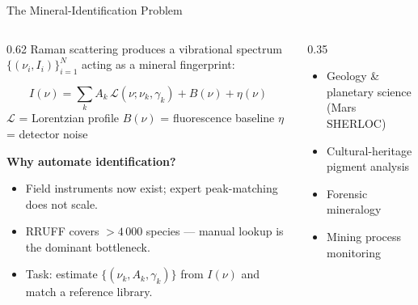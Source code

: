 \documentclass[aspectratio=169,10pt]{beamer}
\begin{document}
\begin{frame}{The Mineral-Identification Problem}
  \begin{columns}[T]
    \begin{column}{0.62\textwidth}
      Raman scattering produces a vibrational spectrum
      $\{(\nu_i,I_i)\}_{i=1}^N$ acting as a mineral fingerprint:\par
      \vspace{0.2cm}
      \begin{tcolorbox}[mathbox]
        \[
          I(\nu)=\sum_k A_k\,\mathcal{L}(\nu;\nu_k,\gamma_k)+B(\nu)+\eta(\nu)
        \]
        \centering\footnotesize
        $\mathcal{L}$ = Lorentzian profile\quad
        $B(\nu)$ = fluorescence baseline\quad
        $\eta$ = detector noise
      \end{tcolorbox}
      \vspace{0.18cm}
      {\small\bfseries\color{headerbg}Why automate identification?}
      \begin{itemize}\setlength\itemsep{0.10cm}\small
        \item Field instruments now exist; expert peak-matching does not scale.
        \item RRUFF covers $>4\,000$ species --- manual lookup is the dominant bottleneck.
        \item Task: estimate $\{(\nu_k,A_k,\gamma_k)\}$ from $I(\nu)$ and match
              a reference library.
      \end{itemize}
    \end{column}
    \begin{column}{0.35\textwidth}
      \begin{tcolorbox}[domainbox, title={Domains directly affected}]
        \footnotesize
        \begin{itemize}\setlength\itemsep{0.10cm}
          \item Geology \& planetary science\\(Mars SHERLOC)
          \item Cultural-heritage pigment analysis
          \item Forensic mineralogy
          \item Mining process monitoring
        \end{itemize}
      \end{tcolorbox}
    \end{column}
  \end{columns}
\end{frame}
\end{document}
